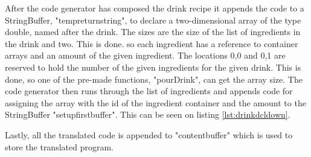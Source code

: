 After the code generator has composed the drink recipe it appends the code to a StringBuffer, "tempreturnstring", to declare a two-dimensional array of the type double, named after the drink. The sizes are the size of the list of ingredients in the drink and two. This is done. so each ingredient has a reference to container arrays and an amount of the given ingredient. The locations 0,0 and 0,1 are reserved to hold the number of the given ingredients for the given drink. This is done, so one of the pre-made functions, "pourDrink", can get the array size. The code generator then runs through the list of ingredients and appends code for assigning the array with the id of the ingredient container and the amount to the StringBuffer "setupfirstbuffer". This can be seen on listing \ref{lst:drinkdcldown}.

Lastly, all the translated code is appended to "contentbuffer" which is used to store the translated program.